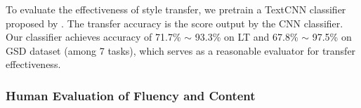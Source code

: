 To evaluate the effectiveness of style transfer, we pretrain a TextCNN classifier proposed by \citet{kim2014convolutional}. The transfer accuracy is the score output by the CNN classifier. Our classifier achieves accuracy of 71.7\% $\sim$ 93.3\% on LT and 67.8\% $\sim$ 97.5\% on GSD dataset (among 7 tasks), which serves as a reasonable evaluator for transfer effectiveness.

\subsubsection*{Human Evaluation of Fluency and Content}


